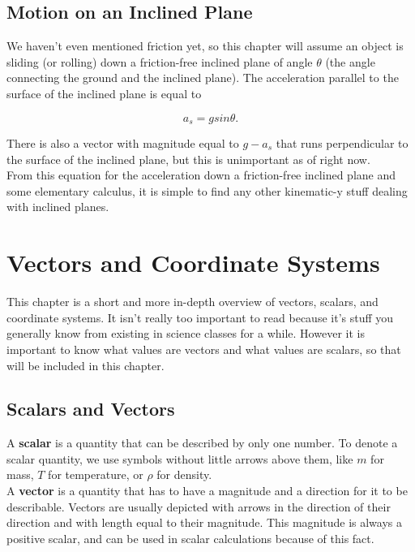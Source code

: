 \documentclass[12pt,letterpaper]{article}
\begin{document}
\subsection[Motion on an Inclined Plane]{Motion on an Inclined Plane}

We haven't even mentioned friction yet, so this chapter will assume an object is sliding (or rolling) down a friction-free inclined plane of angle $\theta$ (the angle connecting the ground and the inclined plane). The acceleration parallel to the surface of the inclined plane is equal to 

\begin{center}
$$a_{s} = gsin\theta.$$ \linebreak
\end{center}

There is also a vector with magnitude equal to $g - a_{s}$ that runs perpendicular to the surface of the inclined plane, but this is unimportant as of right now. \\

From this equation for the acceleration down a friction-free inclined plane and some elementary calculus, it is simple to find any other kinematic-y stuff dealing with inclined planes.

\pagebreak

\section[Vectors and Coordinate Systems]{Vectors and Coordinate Systems}

This chapter is a short and more in-depth overview of vectors, scalars, and coordinate systems. It isn't really too important to read because it's stuff you generally know from existing in science classes for a while. However it is important to know what values are vectors and what values are scalars, so that will be included in this chapter.

\subsection[Scalars and Vectors]{Scalars and Vectors}

A \textbf{scalar} is a quantity that can be described by only one number. To denote a scalar quantity, we use symbols without little arrows above them, like $m$ for mass, $T$ for temperature, or $\rho$ for density. \\

A \textbf{vector} is a quantity that has to have a magnitude and a direction for it to be describable. Vectors are usually depicted with arrows in the direction of their direction and with length equal to their magnitude. This magnitude is always a positive scalar, and can be used in scalar calculations because of this fact. \\
\end{document}
